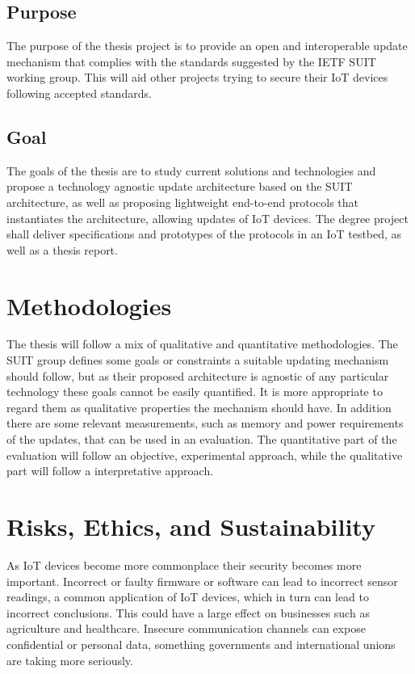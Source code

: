 \documentclass[0-thesis.tex]{subfiles}
\begin{document}
\subsection{Purpose}
\label{ssec:purpose}
The purpose of the thesis project is to provide an open and interoperable update mechanism
that complies with the standards suggested by the IETF SUIT working group. This will aid
other projects trying to secure their IoT devices following accepted standards.

\subsection{Goal}
\label{ssec:goal}
The goals of the thesis are to study current solutions and technologies and propose a
technology agnostic update architecture based on the SUIT architecture, as well as
proposing lightweight end-to-end protocols that instantiates the architecture, allowing
updates of IoT devices. The degree project shall deliver specifications and prototypes of
the protocols in an IoT testbed, as well as a thesis report.

\section{Methodologies}
\label{sec:methodologies}
The thesis will follow a mix of qualitative and quantitative methodologies. The SUIT group
defines some goals or constraints a suitable updating mechanism should follow, but as
their proposed architecture is agnostic of any particular technology these goals cannot be
easily quantified. It is more appropriate to regard them as qualitative properties the
mechanism should have. In addition there are some relevant measurements, such as memory
and power requirements of the updates, that can be used in an evaluation. The quantitative
part of the evaluation will follow an objective, experimental approach, while the
qualitative part will follow a interpretative approach.

\section{Risks, Ethics, and Sustainability}
\label{sec:risks-ethics-sustainability}
As IoT devices become more commonplace their security becomes more important. Incorrect or
faulty firmware or software can lead to incorrect sensor readings, a common application of
IoT devices, which in turn can lead to incorrect conclusions. This could have a large
effect on businesses such as agriculture and healthcare. Insecure communication channels
can expose confidential or personal data, something governments and international unions
are taking more seriously. 
\end{document}
